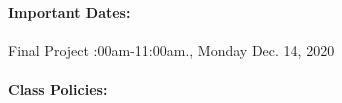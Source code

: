 \documentclass[11pt, a4paper]{article}
\begin{document}
\paragraph{Important Dates:}
\begin{center} \begin{minipage}{3.8in}
\begin{flushleft}
Final Project    :00am-11:00am., Monday Dec. 14, 2020\\
\end{flushleft}
\end{minipage}
\end{center}

\paragraph{Class Policies:}
\end{document}
